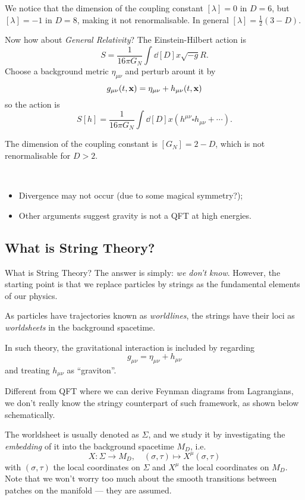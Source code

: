 \documentclass[a4paper,11pt]{article}
\begin{document}
	We notice that the dimension of the coupling constant $[\lambda] = 0$ in $D = 6$, but $[\lambda] = - 1$ in $D = 8$, making it not renormalisable. In general $[\lambda] = \frac{1}{2} (3 - D)$.
	
	Now how about \emph{General Relativity}? The Einstein-Hilbert action is 
	\[
		S = \frac{1}{16 \pi G_N} \int \dd[D]{x} \sqrt{-g} R.
	\]
	Choose a background metric $\eta _{\mu \nu}$ and perturb arount it by 
	\[
		g _{\mu \nu}(t,\vb x) = \eta _{\mu \nu} + h _{\mu \nu}(t, \vb x)
	\]
	so the action is 
	\[
		S[h] = \frac{1}{16 \pi G_N} \int \dd[D]{x} \left( h ^{\mu \nu} \square h _{\mu \nu} + \cdots \right).
	\]
	
	The dimension of the coupling constant is $[G_N] = 2 - D$, which is not renormalisable for $D > 2$.

	\begin{cmt} \ 
		\begin{itemize}
			\item Divergence may not occur (due to some magical symmetry?);
			\item Other arguments suggest gravity is not a QFT at high energies.
		\end{itemize}
	\end{cmt}

	\subsection{What is String Theory?}
	What is String Theory? The answer is simply: \emph{we don't know}. However, the starting point is that we replace particles by strings as the fundamental elements of our physics. 
	
	As particles have trajectories known as \emph{worldlines}, the strings have their loci as \emph{worldsheets} in the background spacetime.
	\needfig{3}

	In such theory, the gravitational interaction is included by regarding 
	\[
		g _{\mu \nu} = \eta _{\mu \nu} + h _{\mu \nu}
	\]
	and treating $h _{\mu \nu}$ as ``graviton''.

	Different from QFT where we can derive Feynman diagrams from Lagrangians, we don't really know the stringy counterpart of such framework, as shown below schematically.


	The worldsheet is usually denoted as $\Sigma$, and we study it by investigating the \emph{embedding} of it into the background spacetime $M_D$, i.e. 
	\[
		X : \Sigma \to M_D,\quad (\sigma , \tau) \mapsto X^\mu (\sigma, \tau)
	\]
	with $(\sigma,\tau)$ the local coordinates on $\Sigma$ and $X^\mu$ the local coordinates on $M_D$. Note that we won't worry too much about the smooth transitions between patches on the manifold --- they are assumed.
\end{document}
